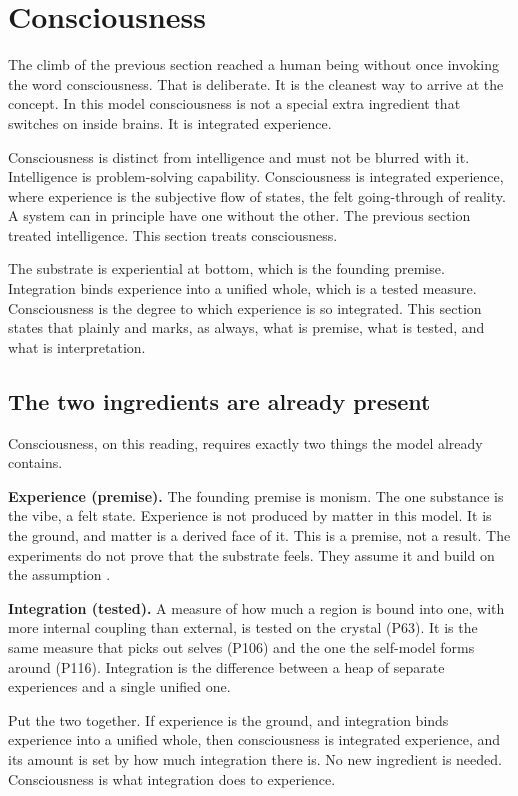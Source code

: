 \section{Consciousness}

The climb of the previous section reached a human being without once invoking the word consciousness. That is deliberate. It is the cleanest way to arrive at the concept. In this model consciousness is not a special extra ingredient that switches on inside brains. It is integrated experience.

Consciousness is distinct from intelligence and must not be blurred with it. Intelligence is problem-solving capability. Consciousness is integrated experience, where experience is the subjective flow of states, the felt going-through of reality. A system can in principle have one without the other. The previous section treated intelligence. This section treats consciousness.

The substrate is experiential at bottom, which is the founding premise. Integration binds experience into a unified whole, which is a tested measure. Consciousness is the degree to which experience is so integrated. This section states that plainly and marks, as always, what is premise, what is tested, and what is interpretation.

\subsection{The two ingredients are already present}

Consciousness, on this reading, requires exactly two things the model already contains.

\textbf{Experience (premise).} The founding premise is monism. The one substance is the vibe, a felt state. Experience is not produced by matter in this model. It is the ground, and matter is a derived face of it. This is a premise, not a result. The experiments do not prove that the substrate feels. They assume it and build on the assumption \cite{chalmers1995}.

\textbf{Integration (tested).} A measure of how much a region is bound into one, with more internal coupling than external, is tested on the crystal (P63). It is the same measure that picks out selves (P106) and the one the self-model forms around (P116). Integration is the difference between a heap of separate experiences and a single unified one.

Put the two together. If experience is the ground, and integration binds experience into a unified whole, then consciousness is integrated experience, and its amount is set by how much integration there is. No new ingredient is needed. Consciousness is what integration does to experience.

